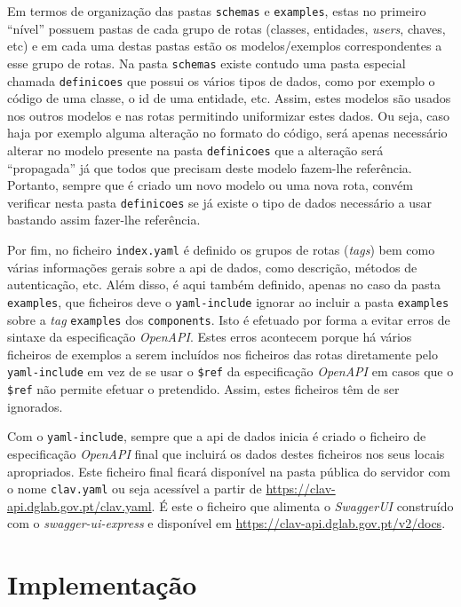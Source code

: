 Em termos de organização das pastas \texttt{schemas} e \texttt{examples}, estas no primeiro ``nível'' possuem pastas de cada grupo de rotas (classes, entidades, \textit{users}, chaves, etc) e em cada uma destas pastas estão os modelos/exemplos correspondentes a esse grupo de rotas. Na pasta \texttt{schemas} existe contudo uma pasta especial chamada \texttt{definicoes} que possui os vários tipos de dados, como por exemplo o código de uma classe, o id de uma entidade, etc. Assim, estes modelos são usados nos outros modelos e nas rotas permitindo uniformizar estes dados. Ou seja, caso haja por exemplo alguma alteração no formato do código, será apenas necessário alterar no modelo presente na pasta \texttt{definicoes} que a alteração será ``propagada'' já que todos que precisam deste modelo fazem-lhe referência. Portanto, sempre que é criado um novo modelo ou uma nova rota, convém verificar nesta pasta \texttt{definicoes} se já existe o tipo de dados necessário a usar bastando assim fazer-lhe referência.

Por fim, no ficheiro \texttt{index.yaml} é definido os grupos de rotas (\textit{tags}) bem como várias informações gerais sobre a \acrshort{api} de dados, como descrição, métodos de autenticação, etc. Além disso, é aqui também definido, apenas no caso da pasta \texttt{examples}, que ficheiros deve o \texttt{yaml-include} ignorar ao incluir a pasta \texttt{examples} sobre a \textit{tag} \texttt{examples} dos \texttt{components}. Isto é efetuado por forma a evitar erros de sintaxe da especificação \textit{OpenAPI}. Estes erros acontecem porque há vários ficheiros de exemplos a serem incluídos nos ficheiros das rotas diretamente pelo \texttt{yaml-include} em vez de se usar o \verb|$ref| da especificação \textit{OpenAPI} em casos que o \verb|$ref| não permite efetuar o pretendido. Assim, estes ficheiros têm de ser ignorados.

Com o \texttt{yaml-include}, sempre que a \acrshort{api} de dados inicia é criado o ficheiro de especificação \textit{OpenAPI} final que incluirá os dados destes ficheiros nos seus locais apropriados. Este ficheiro final ficará disponível na pasta pública do servidor com o nome \texttt{clav.yaml} ou seja acessível a partir de \url{https://clav-api.dglab.gov.pt/clav.yaml}. É este o ficheiro que alimenta o \textit{SwaggerUI} construído com o \textit{swagger-ui-express} e disponível em \url{https://clav-api.dglab.gov.pt/v2/docs}.

\section{Implementação}

